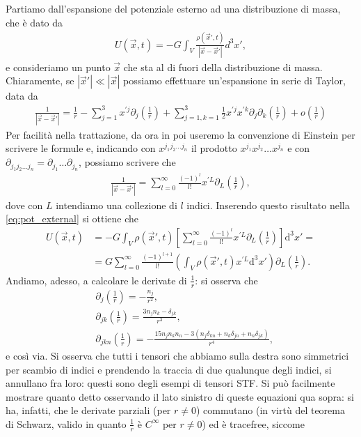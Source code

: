 Partiamo dall'espansione del potenziale esterno ad una distribuzione di massa, che è dato da
\begin{align}
	U(\vec{x}, t) = -G \int_V \frac{\rho(\vec{x}', t)}{|\vec{x} - \vec{x}'|} d^3 x', \label{eq:pot_external}
\end{align}
e consideriamo un punto $\vec{x}$ che sta al di fuori della distribuzione di massa. Chiaramente, se $|\vec{x}'| \ll |\vec{x}|$ possiamo effettuare un'espansione in serie di Taylor, data da
\begin{align}
	\frac{1}{|\vec{x} - \vec{x}'|} = \frac{1}{r} - \sum_{j=1}^3 x^{'j} \partial_j \left( \frac{1}{r} \right) + \sum_{j=1, k=1}^3 \frac12 x^{' j} x^{' k} \partial_j \partial_k \left( \frac{1}{r} \right) + o \left(\frac{1}{r} \right)
\end{align}
Per facilità nella trattazione, da ora in poi useremo la convenzione di Einstein per scrivere le formule e, indicando con $x^{j_1 j_2 \ldots j_n}$ il prodotto $x^{j_1} x^{j_2} \ldots x^{j_n}$ e con $\partial_{j_1 j_2 \ldots j_n} = \partial_{j_1} \ldots \partial_{j_n}$, possiamo scrivere che
\begin{align}
	\frac{1}{|\vec{x} - \vec{x}'|} = \sum_{l=0}^{\infty} \frac{(-1)^l}{l!} x^{' L} \partial_L \left( \frac{1}{r} \right),
\end{align}
dove con $L$ intendiamo una collezione di $l$ indici. Inserendo questo risultato nella \eqref{eq:pot_external} si ottiene che 
\begin{align}
	U(\vec{x}, t) &= -G \int_V \rho(\vec{x}', t) \left[ \sum_{l=0}^{\infty} \frac{(-1)^l}{l!} x^{' L}\partial_L \left( \frac{1}{r} \right) \right] \mathrm{d}^3 x' = \nonumber \\
		      &= G \sum_{l=0}^{\infty} \frac{(-1)^{l+1}}{l!} \left( \int_V \rho(\vec{x}', t) x^{' L} \mathrm{d}^3 x' \right) \partial_L \left( \frac{1}{r} \right).
\end{align}
Andiamo, adesso, a calcolare le derivate di $\frac{1}{r}$: si osserva che
\begin{align}
	&\partial_j \left( \frac{1}{r} \right) = -\frac{n_j}{r^2}, \\
	&\partial_{jk} \left( \frac{1}{r} \right) = \frac{3 n_j n_k - \delta_{jk}}{r^3}, \\
	&\partial_{jkn} \left( \frac{1}{r} \right) = -\frac{15 n_j n_k n_n - 3(n_j \delta_{kn} + n_k \delta_{jn} + n_n \delta_{jk})}{r^4},
\end{align}
e così via. Si osserva che tutti i tensori che abbiamo sulla destra sono simmetrici per scambio di indici e prendendo la traccia di due qualunque degli indici, si annullano fra loro: questi sono degli esempi di tensori STF. Si può facilmente mostrare quanto detto osservando il lato sinistro di queste equazioni qua sopra: si ha, infatti, che le derivate parziali (per $r \neq 0$) commutano (in virtù del teorema di Schwarz, valido in quanto $\frac{1}{r}$ è $C^{\infty}$ per $r \neq 0$) ed è tracefree, siccome
